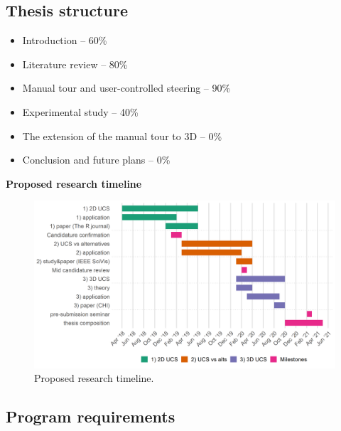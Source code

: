 \documentclass[11,]{article}
\providecommand{\tightlist}{%
  \setlength{\itemsep}{0pt}\setlength{\parskip}{0pt}}
\begin{document}
\hypertarget{thesis-structure}{%
\subsection{Thesis structure}\label{thesis-structure}}

\begin{itemize}
\tightlist
\item
  Introduction -- 60\%
\item
  Literature review -- 80\%
\item
  Manual tour and user-controlled steering -- 90\%
\item
  Experimental study -- 40\%
\item
  The extension of the manual tour to 3D -- 0\%
\item
  Conclusion and future plans -- 0\%
\end{itemize}

\textbf{Proposed research timeline}

\begin{figure}[h]

{\centering \includegraphics[width=1\linewidth,]{figures/phd_timeline} 

}

\caption{Proposed research timeline.}\label{fig:timeline}
\end{figure}

\hypertarget{program-requirements}{%
\subsection{Program requirements}\label{program-requirements}}
\end{document}
